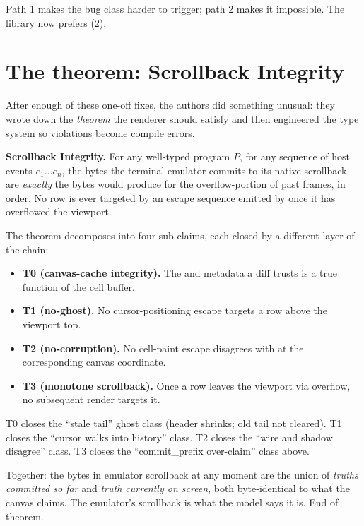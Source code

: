 Path 1 makes the bug class harder to trigger; path 2 makes it
impossible. The library now prefers (2).

\section{The theorem: Scrollback Integrity}

After enough of these one-off fixes, the \maya{} authors did
something unusual: they wrote down the \emph{theorem} the renderer
should satisfy and then engineered the type system so violations
become compile errors.

\begin{theory}
\textbf{Scrollback Integrity.} For any well-typed \maya{} program
$P$, for any sequence of host events $e_1 \ldots e_n$, the bytes
the terminal emulator commits to its native scrollback are
\emph{exactly} the bytes  would produce for the
overflow-portion of past frames, in order. No row is ever targeted
by an escape sequence emitted by \maya{} once it has overflowed the
viewport.
\end{theory}

The theorem decomposes into four sub-claims, each closed by a
different layer of the chain:

\begin{itemize}[leftmargin=*]
  \item \textbf{T0 (canvas-cache integrity).} The
     and 
    metadata a diff trusts is a true function of the cell buffer.
  \item \textbf{T1 (no-ghost).} No cursor-positioning escape
    targets a row above the viewport top.
  \item \textbf{T2 (no-corruption).} No cell-paint escape
    disagrees with  at the corresponding
    canvas coordinate.
  \item \textbf{T3 (monotone scrollback).} Once a row leaves the
    viewport via  overflow,
    no subsequent render targets it.
\end{itemize}

T0 closes the ``stale tail'' ghost class (header shrinks; old tail
not cleared). T1 closes the ``cursor walks into history''
class. T2 closes the ``wire and shadow disagree'' class. T3 closes
the ``commit\_prefix over-claim'' class above.

Together: the bytes in emulator scrollback at any moment are the
union of \emph{truths committed so far} and \emph{truth currently on
screen}, both byte-identical to what the canvas claims. The
emulator's scrollback is what the model says it is. End of theorem.

